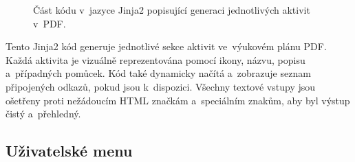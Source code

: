 \documentclass[male,czech,api_bc]{kitheses}
\begin{document}
\begin{figure}[H]
	\centering
	\caption{Část kódu v~jazyce Jinja2 popisující generaci jednotlivých aktivit v~PDF.}
	\label{fig:code-4}
\end{figure}

Tento Jinja2 kód generuje jednotlivé sekce aktivit ve~výukovém plánu PDF. Každá aktivita je vizuálně reprezentována pomocí ikony, názvu, popisu a~případných pomůcek. Kód také dynamicky načítá a~zobrazuje seznam připojených odkazů, pokud jsou k~dispozici. Všechny textové vstupy jsou ošetřeny proti nežádoucím HTML značkám a~speciálním znakům, aby byl výstup čistý a~přehledný.

\subsection{Uživatelské menu}
\end{document}

